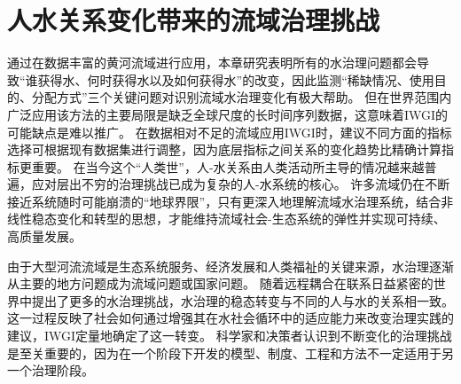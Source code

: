 \section{人水关系变化带来的流域治理挑战}

通过在数据丰富的黄河流域进行应用，本章研究表明所有的水治理问题都会导致“谁获得水、何时获得水以及如何获得水”的改变，因此监测“稀缺情况、使用目的、分配方式”三个关键问题对识别流域水治理变化有极大帮助。
但在世界范围内广泛应用该方法的主要局限是缺乏全球尺度的长时间序列数据，这意味着IWGI的可能缺点是难以推广。
在数据相对不足的流域应用IWGI时，建议不同方面的指标选择可根据现有数据集进行调整，因为底层指标之间关系的变化趋势比精确计算指标更重要。
在当今这个“人类世”，人-水关系由人类活动所主导的情况越来越普遍，应对层出不穷的治理挑战已成为复杂的人-水系统的核心\cite{cumming2018,cumming2014,jaeger2019}。
许多流域仍在不断接近系统随时可能崩溃的“地球界限”\cite{gleeson2020, wang-erlandsson2022}，只有更深入地理解流域水治理系统，结合非线性稳态变化和转型的思想，才能维持流域社会-生态系统的弹性并实现可持续、高质量发展\cite{falkenmark2019}。

由于大型河流流域是生态系统服务、经济发展和人类福祉的关键来源，水治理逐渐从主要的地方问题成为流域问题或国家问题\cite{best2019,best2020}。
随着远程耦合在联系日益紧密的世界中提出了更多的水治理挑战，水治理的稳态转变与不同的人与水的关系相一致\cite{diaz2019}。
这一过程反映了社会如何通过增强其在水社会循环中的适应能力来改变治理实践的建议，IWGI定量地确定了这一转变\cite{loch2020,turton1999}。
科学家和决策者认识到不断变化的治理挑战是至关重要的，因为在一个阶段下开发的模型、制度、工程和方法不一定适用于另一个治理阶段\cite{reyers2018}。
